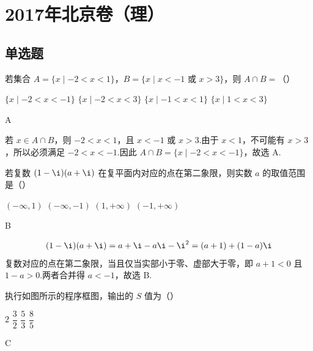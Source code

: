 \chapter{2017年北京卷（理）}

\section{单选题}

\begin{problem}
若集合 \(A=\{x\mid -2<x<1\}\)，\(B=\{x\mid x<-1\text{ 或 }x>3\}\)，则 \(A\cap B=\)（\quad）

\choices
    {\(\{x\mid -2<x<-1\}\)}
    {\(\{x\mid -2<x<3\}\)}
    {\(\{x\mid -1<x<1\}\)}
    {\(\{x\mid 1<x<3\}\)}
\end{problem}

\begin{answer}
A
\end{answer}

\begin{solution}
若 \(x\in A\cap B\)，则 \(-2<x<1\)，且 \(x<-1\) 或 \(x>3\).由于 \(x<1\)，不可能有 \(x>3\)，所以必须满足 \(-2<x<-1\).因此 \(A\cap B=\{x\mid -2<x<-1\}\)，故选 A.
\end{solution}

\begin{problem}
若复数 \((1-\i)(a+\i)\) 在复平面内对应的点在第二象限，则实数 \(a\) 的取值范围是（\quad）

\choices
    {\((-\infty,1)\)}
    {\((-\infty,-1)\)}
    {\((1,+\infty)\)}
    {\((-1,+\infty)\)}
\end{problem}

\begin{answer}
B
\end{answer}

\begin{solution}
\[
(1-\i)(a+\i)=a+\i-a\i-\i^2=(a+1)+(1-a)\i
\]
复数对应的点在第二象限，当且仅当实部小于零、虚部大于零，即 \(a+1<0\) 且 \(1-a>0\).两者合并得 \(a<-1\)，故选 B.
\end{solution}

\begin{problem}
执行如图所示的程序框图，输出的 \(S\) 值为（\quad）


\choices
    {\(2\)}
    {\(\dfrac32\)}
    {\(\dfrac53\)}
    {\(\dfrac85\)}
\end{problem}

\begin{answer}
C
\end{answer}

